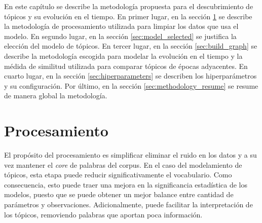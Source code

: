 En este capítulo se describe la metodología propuesta para el descubrimiento de tópicos y su evolución en el tiempo. En primer lugar, en la sección \ref{sec:processing} se describe la metodología de procesamiento utilizada para limpiar los datos que usa el modelo. En segundo lugar, en la sección \ref{sec:model_selected} se justifica la elección del modelo de tópicos. En tercer lugar, en la sección \ref{sec:build_graph} se describe la metodología escogida para modelar la evolución en el tiempo y la médida de similitud utilizada para comparar tópicos de épocas adyacentes. En cuarto lugar, en la sección \ref{sec:hiperparameters} se describen los hiperparámetros y su configuración. Por último, en la sección \ref{sec:methodology_resume} se resume de manera global la metodología.

\section{Procesamiento}
\label{sec:processing}

El propósito del procesamiento es simplificar eliminar el ruido en los datos y a su vez mantener el \textit{core} de palabras del corpus. En el caso del modelamiento de tópicos, esta etapa puede reducir significativamente el vocabulario. Como consecuencia, esto puede traer una mejora en la significancia estadística de los modelos, puesto que se puede obtener un mejor balance entre cantidad de parámetros y observaciones. Adicionalmente, puede facilitar la interpretación de los tópicos, removiendo palabras que aportan poca información.\\

